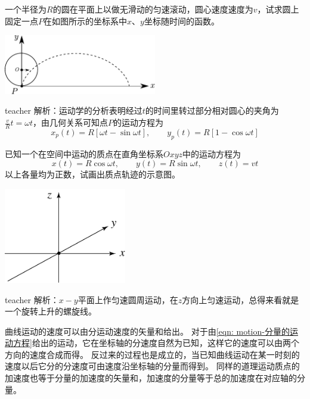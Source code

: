 \begin{example}
一个半径为$R$的圆在平面上以做无滑动的匀速滚动，圆心速度速度为$v$，试求圆上固定一点$P$在如图所示的坐标系中$x、y$坐标随时间的函数。
\begin{flushright}
\includegraphics[width = 0.5\textwidth]{images/motion-19.pdf}  
\end{flushright}
\begin{taggedblock}{teacher}
\noindent
解析：运动学的分析表明经过$t$的时间里转过部分相对圆心的夹角为$\frac{v}{R}t=\omega t$，由几何关系可知点$P$的运动方程为
\[
x_p(t) = R[\omega t - \sin\omega t],\qquad y_p(t) = R[1-\cos\omega t]
\]
\end{taggedblock}
\end{example}




\begin{example}
已知一个在空间中运动的质点在直角坐标系$Oxyz$中的运动方程为
\[x(t) = R\cos\omega t,\qquad y(t) = R\sin\omega t,\qquad z(t) = vt \]
以上各量均为正数，试画出质点轨迹的示意图。
\begin{flushright}
\includegraphics[width=0.4\textwidth]{images/motion-problem-36.pdf}
\end{flushright}
\begin{taggedblock}{teacher}
\noindent
解析：$x-y$平面上作匀速圆周运动，在$z$方向上匀速运动，总得来看就是一个旋转上升的螺旋线。
\end{taggedblock}
\end{example}

曲线运动的速度可以由分运动速度的矢量和给出。
对于由\ref{eqn: motion-分量的运动方程}给出的运动，它在坐标轴的分速度自然为已知，这样它的速度可以由两个方向的速度合成而得。
反过来的过程也是成立的，当已知曲线运动在某一时刻的速度以后它分的分速度可由速度沿坐标轴的分量而得到。
同样的道理运动质点的加速度也等于分量的加速度的矢量和，加速度的分量等于总的加速度在对应轴的分量。


